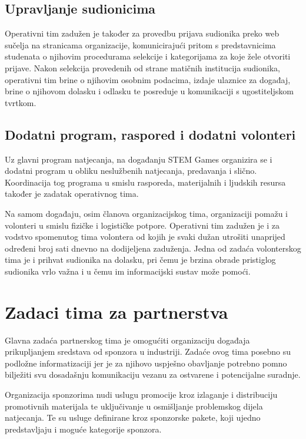 \documentclass[times, utf8, diplomski]{fer}
\begin{document}
\subsection{Upravljanje sudionicima}

Operativni tim zadužen je također za provedbu prijava sudionika preko web
sučelja na stranicama organizacije, komunicirajući pritom s predstavnicima
studenata o njihovim procedurama selekcije i kategorijama za koje žele otvoriti
prijave. Nakon selekcija provedenih od strane matičnih institucija sudionika,
operativni tim brine o njihovim osobnim podacima, izdaje ulaznice za događaj,
brine o njihovom dolasku i odlasku te posreduje u komunikaciji s ugostiteljskom
tvrtkom.

\subsection{Dodatni program, raspored i dodatni volonteri}

Uz glavni program natjecanja, na događanju STEM Games organizira se i dodatni
program u obliku neslužbenih natjecanja, predavanja i slično. Koordinacija tog
programa u smislu rasporeda, materijalnih i ljudskih resursa također je zadatak
operativnog tima.

Na samom događaju, osim članova organizacijskog tima, organizaciji pomažu i
volonteri u smislu fizičke i logističke potpore. Operativni tim zadužen je i za
vodstvo spomenutog tima volontera od kojih je svaki dužan utrošiti unaprijed
određeni broj sati dnevno na dodijeljena zaduženja. Jedna od zadaća volonterskog
tima je i prihvat sudionika na dolasku, pri čemu je brzina obrade pristiglog
sudionika vrlo važna i u čemu im informacijski sustav može pomoći.

\section{Zadaci tima za partnerstva}

Glavna zadaća partnerskog tima je omogućiti organizaciju događaja prikupljanjem
sredstava od sponzora u industriji. Zadaće ovog tima posebno su podložne
informatizaciji jer je za njihovo uspješno obavljanje potrebno pomno bilježiti
svu dosadašnju komunikaciju vezanu za ostvarene i potencijalne suradnje.

Organizacija sponzorima nudi uslugu promocije kroz izlaganje i distribuciju
promotivnih materijala te uključivanje u osmišljanje problemskog dijela
natjecanja. Te su usluge definirane kroz sponzorske pakete, koji ujedno
predstavljaju i moguće kategorije sponzora.
\end{document}
